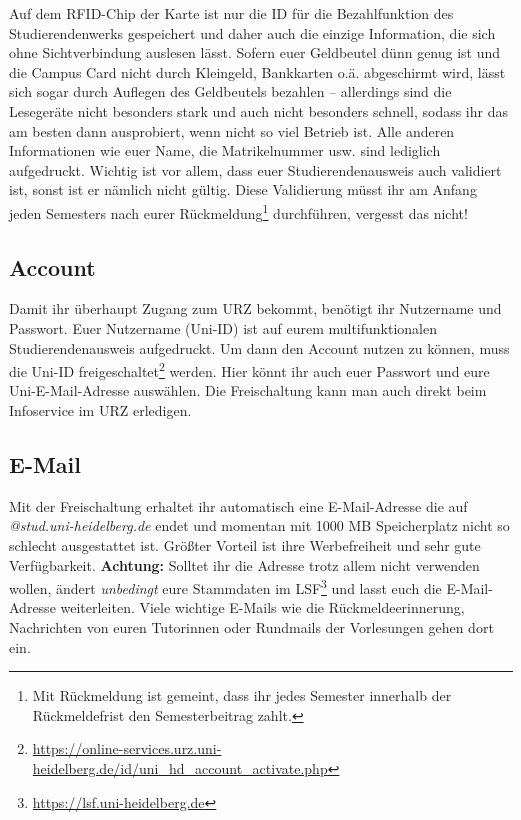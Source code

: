 Auf dem RFID-Chip der Karte ist nur die ID für die Bezahlfunktion des Studierendenwerks gespeichert und daher auch die einzige Information, die sich ohne Sichtverbindung auslesen lässt. Sofern euer Geldbeutel dünn genug ist und die Campus Card nicht durch Kleingeld, Bankkarten o.ä. abgeschirmt wird, lässt sich sogar durch Auflegen des Geldbeutels bezahlen -- allerdings sind die Lesegeräte nicht besonders stark und auch nicht besonders schnell, sodass ihr das am besten dann ausprobiert, wenn nicht so viel Betrieb ist. Alle anderen Informationen wie euer Name, die Matrikelnummer usw. sind lediglich aufgedruckt. Wichtig ist vor allem, dass euer Studierendenausweis auch validiert ist, sonst ist er nämlich nicht gültig. Diese Validierung müsst ihr am Anfang jeden Semesters nach eurer Rückmeldung\footnote{Mit Rückmeldung ist gemeint, dass ihr jedes Semester innerhalb der Rückmeldefrist den Semesterbeitrag zahlt.} durchführen, vergesst das nicht!

\subsection{Account}
Damit ihr überhaupt Zugang zum URZ bekommt, benötigt ihr Nutzername und Passwort. Euer Nutzername (Uni-ID) ist auf eurem multifunktionalen Studierendenausweis aufgedruckt. Um dann den Account nutzen zu können, muss die Uni-ID freigeschaltet\footnote{\url{https://online-services.urz.uni-heidelberg.de/id/uni_hd_account_activate.php}} werden. Hier könnt ihr auch euer Passwort und eure Uni-E-Mail-Adresse auswählen. Die Freischaltung kann man auch direkt beim Infoservice im URZ erledigen.

\vspace*{-2mm}
\subsection{E-Mail}
\vspace*{-1mm}
Mit der Freischaltung erhaltet ihr automatisch eine E-Mail-Adresse die auf \emph{@stud.uni-heidelberg.de} endet und momentan mit 1000 MB Speicherplatz nicht so schlecht ausgestattet ist. Größter Vorteil ist ihre Werbefreiheit und sehr gute Verfügbarkeit. \textbf{Achtung:} Solltet ihr die Adresse trotz allem nicht verwenden wollen, ändert \emph{unbedingt} eure Stammdaten im LSF\footnote{\url{https://lsf.uni-heidelberg.de}} und lasst euch die E-Mail-Adresse weiterleiten. Viele wichtige E-Mails wie die Rückmeldeerinnerung, Nachrichten von euren Tutorinnen oder Rundmails der Vorlesungen gehen dort ein.

